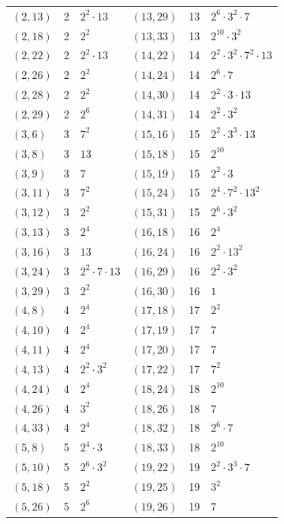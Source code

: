 \documentclass[11pt]{article}
\begin{document}
\begin{longtable}{@{}lrl@{\qquad}lrl@{}}
$(2,13)$ & 2 & $2^{2}\cdot 13$ & $(13,29)$ & 13 & $2^{6}\cdot 3^{2}\cdot 7$\\
$(2,18)$ & 2 & $2^{2}$ & $(13,33)$ & 13 & $2^{10}\cdot 3^{2}$\\
$(2,22)$ & 2 & $2^{2}\cdot 13$ & $(14,22)$ & 14 & $2^{2}\cdot 3^{2}\cdot 7^{2}\cdot 13$\\
$(2,26)$ & 2 & $2^{2}$ & $(14,24)$ & 14 & $2^{6}\cdot 7$\\
$(2,28)$ & 2 & $2^{2}$ & $(14,30)$ & 14 & $2^{2}\cdot 3\cdot 13$\\
$(2,29)$ & 2 & $2^{6}$ & $(14,31)$ & 14 & $2^{2}\cdot 3^{2}$\\
$(3,6)$ & 3 & $7^{2}$ & $(15,16)$ & 15 & $2^{2}\cdot 3^{3}\cdot 13$\\
$(3,8)$ & 3 & $13$ & $(15,18)$ & 15 & $2^{10}$\\
$(3,9)$ & 3 & $7$ & $(15,19)$ & 15 & $2^{2}\cdot 3$\\
$(3,11)$ & 3 & $7^{2}$ & $(15,24)$ & 15 & $2^{4}\cdot 7^{2}\cdot 13^{2}$\\
$(3,12)$ & 3 & $2^{2}$ & $(15,31)$ & 15 & $2^{6}\cdot 3^{2}$\\
$(3,13)$ & 3 & $2^{4}$ & $(16,18)$ & 16 & $2^{4}$\\
$(3,16)$ & 3 & $13$ & $(16,24)$ & 16 & $2^{2}\cdot 13^{2}$\\
$(3,24)$ & 3 & $2^{2}\cdot 7\cdot 13$ & $(16,29)$ & 16 & $2^{2}\cdot 3^{2}$\\
$(3,29)$ & 3 & $2^{2}$ & $(16,30)$ & 16 & $1$\\
$(4,8)$ & 4 & $2^{4}$ & $(17,18)$ & 17 & $2^{2}$\\
$(4,10)$ & 4 & $2^{4}$ & $(17,19)$ & 17 & $7$\\
$(4,11)$ & 4 & $2^{4}$ & $(17,20)$ & 17 & $7$\\
$(4,13)$ & 4 & $2^{2}\cdot 3^{2}$ & $(17,22)$ & 17 & $7^{2}$\\
$(4,24)$ & 4 & $2^{4}$ & $(18,24)$ & 18 & $2^{10}$\\
$(4,26)$ & 4 & $3^{2}$ & $(18,26)$ & 18 & $7$\\
$(4,33)$ & 4 & $2^{4}$ & $(18,32)$ & 18 & $2^{6}\cdot 7$\\
$(5,8)$ & 5 & $2^{4}\cdot 3$ & $(18,33)$ & 18 & $2^{10}$\\
$(5,10)$ & 5 & $2^{6}\cdot 3^{2}$ & $(19,22)$ & 19 & $2^{2}\cdot 3^{3}\cdot 7$\\
$(5,18)$ & 5 & $2^{2}$ & $(19,25)$ & 19 & $3^{2}$\\
$(5,26)$ & 5 & $2^{6}$ & $(19,26)$ & 19 & $7$\\

\end{longtable}
\end{document}
